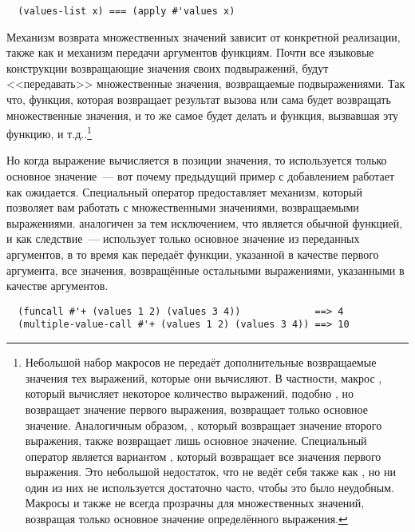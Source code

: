 \begin{verbatim}
  (values-list x) === (apply #'values x)
\end{verbatim}

Механизм возврата множественных значений зависит от конкретной реализации, также как и
механизм передачи аргументов функциям.  Почти все языковые конструкции возвращающие
значения своих подвыражений, будут <<передавать>> множественные значения, возвращаемые
подвыражениями.  Так что, функция, которая возвращает результат вызова  или
 сама будет возвращать множественные значения, и то же самое будет
делать и функция, вызвавшая эту функцию, и т.д..\footnote{Небольшой набор макросов не
  передаёт дополнительные возвращаемые значения тех выражений, которые они вычисляют.  В
  частности, макрос , который вычисляет некоторое количество выражений,
  подобно , но возвращает значение первого выражения, возвращает только
  основное значение.  Аналогичным образом, , который возвращает значение
  второго выражения, также возвращает лишь основное значение.  Специальный оператор
   является вариантом , который возвращает все
  значения первого выражения.  Это небольшой недостаток, что  не ведёт себя
  также как , но ни один из них не используется достаточно
  часто, чтобы это было неудобным.  Макросы  и  также не всегда
  прозрачны для множественных значений, возвращая только основное значение определённого
  выражения.}

Но когда выражение вычисляется в позиции значения, то используется только основное
значение~--- вот почему предыдущий пример с добавлением работает как ожидается. Специальный
оператор  предоставляет механизм, который позволяет вам работать
с множественными значениями, возвращаемыми выражениями. 
аналогичен  за тем исключением, что  является обычной
функцией, и как следствие~--- использует только основное значение из переданных аргументов,
в то время как  передаёт функции, указанной в качестве первого
аргумента, все значения, возвращённые остальными выражениями, указанными в качестве
аргументов.

\begin{verbatim}
  (funcall #'+ (values 1 2) (values 3 4))             ==> 4
  (multiple-value-call #'+ (values 1 2) (values 3 4)) ==> 10
\end{verbatim}

